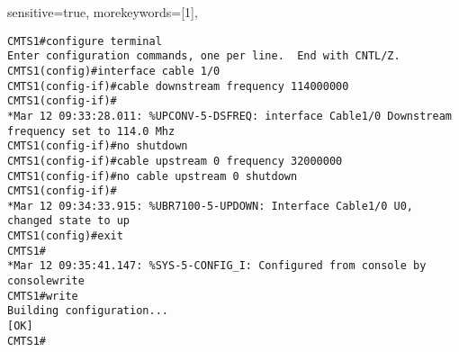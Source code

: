 \usepackage{listings} 
\usepackage{inconsolata} 
\usepackage{blindtext,expdlist} 

{ 
sensitive=true, 
morekeywords=[1]{}, 
} 

\begin{lstlisting}[language=CISCO] 
CMTS1#configure terminal 
Enter configuration commands, one per line.  End with CNTL/Z. 
CMTS1(config)#interface cable 1/0 
CMTS1(config-if)#cable downstream frequency 114000000 
CMTS1(config-if)# 
*Mar 12 09:33:28.011: %UPCONV-5-DSFREQ: interface Cable1/0 Downstream frequency set to 114.0 Mhz 
CMTS1(config-if)#no shutdown 
CMTS1(config-if)#cable upstream 0 frequency 32000000 
CMTS1(config-if)#no cable upstream 0 shutdown 
CMTS1(config-if)# 
*Mar 12 09:34:33.915: %UBR7100-5-UPDOWN: Interface Cable1/0 U0, changed state to up 
CMTS1(config)#exit 
CMTS1# 
*Mar 12 09:35:41.147: %SYS-5-CONFIG_I: Configured from console by consolewrite 
CMTS1#write 
Building configuration... 
[OK] 
CMTS1# 
\end{lstlisting} 